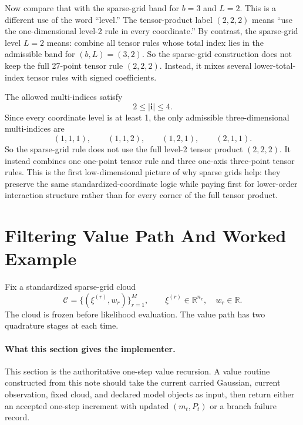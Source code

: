 \documentclass[11pt]{article}
\numberwithin{equation}{section}
\newcommand{\R}{\mathbb R}
\begin{document}
Now compare that with the sparse-grid band for \(b=3\) and \(L=2\).  This is a
different use of the word ``level.''  The tensor-product label \((2,2,2)\)
means ``use the one-dimensional level-2 rule in every coordinate.''  By
contrast, the sparse-grid level \(L=2\) means: combine all tensor rules whose
total index lies in the admissible band for \((b,L)=(3,2)\).  So the sparse-grid
construction does not keep the full 27-point tensor rule \((2,2,2)\).  Instead,
it mixes several lower-total-index tensor rules with signed coefficients.

The allowed multi-indices satisfy
\begin{equation}
  2\le |\mathbf i| \le 4.
  \label{eq:p37-3d-band}
\end{equation}
Since every coordinate level is at least 1, the only admissible three-dimensional
multi-indices are
\begin{equation}
  (1,1,1),
  \qquad
  (1,1,2),
  \qquad
  (1,2,1),
  \qquad
  (2,1,1).
  \label{eq:p37-3d-active-indices}
\end{equation}
So the sparse-grid rule does not use the full level-2 tensor product
\((2,2,2)\).  It instead combines one one-point tensor rule and three
one-axis three-point tensor rules.  This is the first low-dimensional picture of
why sparse grids help: they preserve the same standardized-coordinate logic while
paying first for lower-order interaction structure rather than for every corner
of the full tensor product.

\section{Filtering Value Path And Worked Example}
\label{sec:p31-value-path}

Fix a standardized sparse-grid cloud
\begin{equation}
  \mathcal C=\{(\xi^{(r)},w_r)\}_{r=1}^M,
  \qquad
  \xi^{(r)}\in\R^{n_x},
  \quad
  w_r\in\R.
  \label{eq:p31-cloud-for-filter}
\end{equation}
The cloud is frozen before likelihood evaluation.  The value path has two
quadrature stages at each time.

\paragraph{What this section gives the implementer.}
This section is the authoritative one-step value recursion.  A value routine
constructed from this note should take the current carried Gaussian,
current observation, fixed cloud, and declared model objects as input, then
return either an accepted one-step increment with updated \((m_t,P_t)\) or a
branch failure record.
\end{document}

